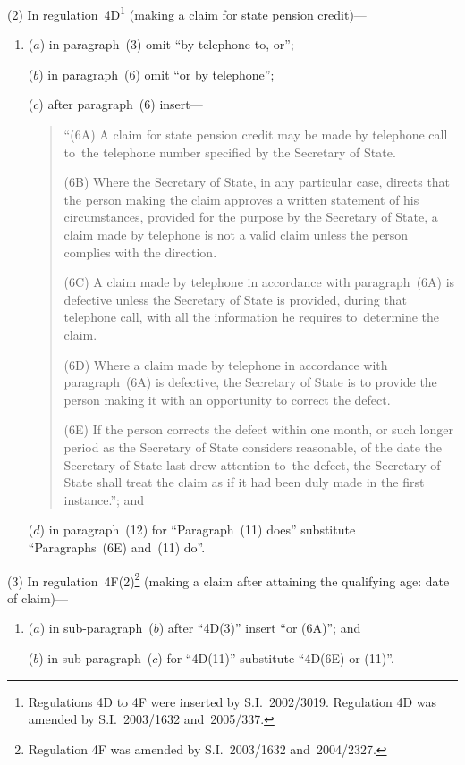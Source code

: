 \documentclass[12pt,a4paper]{article}
\begin{document}
(2) In regulation~4D\footnote{Regulations 4D to 4F were inserted by S.I.~2002/3019. Regulation 4D was amended by S.I.~2003/1632 and~2005/337.} (making a claim for state pension credit)—
\begin{enumerate}\item[]
($a$) in paragraph~(3) omit “by telephone to, or”;

($b$) in paragraph~(6) omit “or by telephone”;

($c$) after paragraph~(6) insert—
\begin{quotation}
“(6A) A claim for state pension credit may be made by telephone call to~the telephone number specified by the Secretary of State.

(6B) Where the Secretary of State, in any particular case, directs that the person making the claim approves a written statement of his circumstances, provided for the purpose by the Secretary of State, a claim made by telephone is not a valid claim unless the person complies with the direction.

(6C) A claim made by telephone in accordance with paragraph~(6A) is defective unless the Secretary of State is provided, during that telephone call, with all the information he requires to~determine the claim.

(6D) Where a claim made by telephone in accordance with paragraph~(6A) is defective, the Secretary of State is to provide the person making it with an opportunity to correct the defect.

(6E) If the person corrects the defect within one month, or such longer period as the Secretary of State considers reasonable, of the date the Secretary of State last drew attention to~the defect, the Secretary of State shall treat the claim as if it had been duly made in the first instance.”; and
\end{quotation}

($d$) in paragraph~(12) for “Paragraph~(11) does” substitute “Paragraphs~(6E) and~(11) do”.
\end{enumerate}

(3) In regulation~4F(2)\footnote{Regulation 4F was amended by S.I.~2003/1632 and~2004/2327.} (making a claim after attaining the qualifying age: date of claim)—
\begin{enumerate}\item[]
($a$) in sub-paragraph~($b$)  after “4D(3)” insert “or (6A)”; and

($b$) in sub-paragraph~($c$)  for “4D(11)” substitute “4D(6E) or (11)”.
\end{enumerate}
\end{document}
